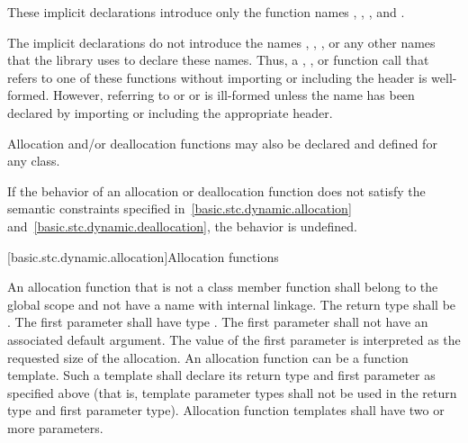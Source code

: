 These implicit declarations introduce only the function names
,
,
, and
.
\begin{note}
The implicit declarations do not introduce
the names ,
,
,
or any other names that the library uses to
declare these names. Thus, a ,
, or function call that refers to one of
these functions without importing or including the header  is
well-formed. However, referring to 
or 
or 
is ill-formed unless the name has been declared
by importing or including the appropriate header.
\end{note}
Allocation and/or
deallocation functions may also be declared and defined for any
class.

\pnum
If the behavior of an allocation or deallocation function
does not satisfy the semantic constraints
specified in~\ref{basic.stc.dynamic.allocation}
and~\ref{basic.stc.dynamic.deallocation},
the behavior is undefined.

[basic.stc.dynamic.allocation]{Allocation functions}

\pnum
{}%
An allocation function that is not a class member function
shall belong to the global scope and not have a name with internal linkage.
The return type shall be . The first
parameter shall have type . The
first parameter shall not have an associated default
argument. The value of the first parameter
is interpreted as the requested size of the allocation. An allocation
function can be a function template. Such a template shall declare its
return type and first parameter as specified above (that is, template
parameter types shall not be used in the return type and first parameter
type). Allocation function templates shall have two or more parameters.

